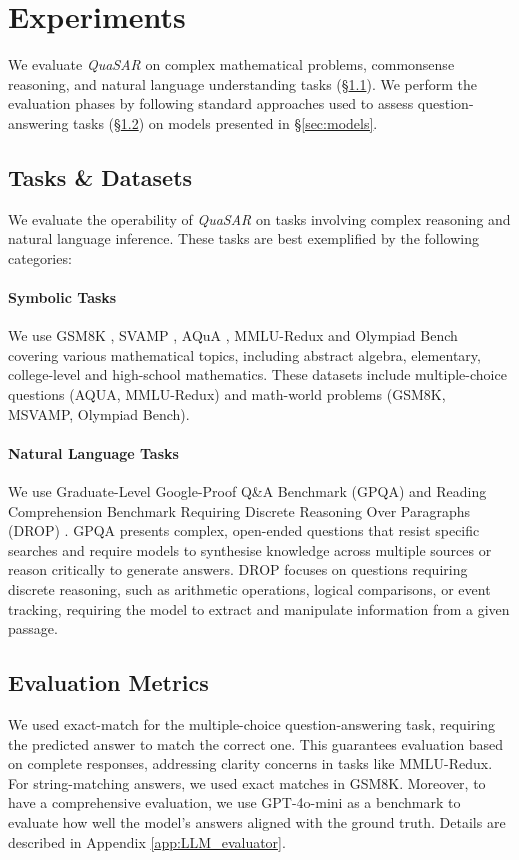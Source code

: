 \documentclass[11pt]{article}
\newcommand{\QuaSAR}{\emph{QuaSAR}\xspace}
\begin{document}
\section{Experiments}
\label{sec:exp_setup}
We evaluate \QuaSAR on complex mathematical problems, commonsense reasoning, and
natural language understanding tasks (\S \ref{sec:data}). We perform the evaluation phases by following standard approaches used to assess question-answering tasks (\S \ref{sec:evaluation}) on models presented in \S \ref{sec:models}. 


\subsection{Tasks \& Datasets}
\label{sec:data}
We evaluate the operability of \QuaSAR on tasks involving complex reasoning and natural language inference. These tasks are best exemplified by the following categories:

\paragraph{Symbolic Tasks} We use GSM8K \cite{cobbe2021training}, SVAMP \cite{patel-etal-2021-nlp}, AQuA \cite{ling2017program}, MMLU-Redux \cite{gema2024we} and Olympiad Bench \cite{he2024olympiadbench} covering various mathematical topics, including abstract algebra, elementary, college-level and high-school mathematics.  
These datasets include multiple-choice questions (AQUA, MMLU-Redux) and math-world problems (GSM8K, MSVAMP, Olympiad Bench).

\paragraph{Natural Language Tasks}
We use Graduate-Level Google-Proof Q\&A Benchmark (GPQA) \cite{rein2023gpqagraduatelevelgoogleproofqa} and Reading Comprehension Benchmark Requiring Discrete Reasoning Over Paragraphs (DROP) \cite{dua-etal-2019-drop}. GPQA presents complex, open-ended questions that resist specific searches and require models to synthesise knowledge across multiple sources or reason critically to generate answers. DROP focuses on questions requiring discrete reasoning, such as arithmetic operations, logical comparisons, or event tracking, requiring the model to extract and manipulate information from a given passage. 

\subsection{Evaluation Metrics}
\label{sec:evaluation}
We used exact-match for the multiple-choice question-answering task, requiring the predicted answer to match the correct one. This guarantees evaluation based on complete responses, addressing clarity concerns in tasks like MMLU-Redux. For string-matching answers, we used exact matches in GSM8K. Moreover, to have a comprehensive evaluation, we use GPT-4o-mini as a benchmark to evaluate how well the model's answers aligned with the ground truth. Details are described in Appendix \ref{app:LLM_evaluator}.
\end{document}

